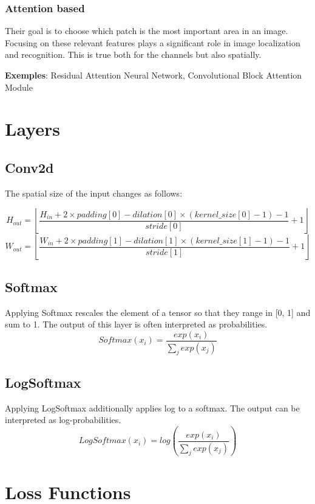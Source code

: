 \subsubsection{Attention based}
Their goal is to choose which patch is the most important area in an image. Focusing on these relevant features plays a significant role in image localization and recognition. This is true both for the channels but also spatially.

\textbf{Exemples}: Residual Attention Neural Network, Convolutional Block Attention Module

\section{Layers}
\subsection{Conv2d}
The spatial size of the input changes as follows:

\begin{equation}
    H_{out} = \left\lfloor \frac{H_{in}+2\times padding[0] - dilation[0]\times (kernel\_size[0]-1)-1}{stride[0]}+1 \right\rfloor
\end{equation}
\begin{equation}
    W_{out} = \left\lfloor \frac{W_{in}+2\times padding[1]-dilation[1]\times(kernel\_size[1]-1)-1}{stride[1]}+1 \right\rfloor
\end{equation}

\subsection{Softmax}
Applying Softmax rescales the element of a tensor so that they range in [0, 1] and sum to 1. The output of this layer is often interpreted as probabilities.
\begin{equation}
    Softmax(x_i) = \frac{exp(x_i)}{\sum_j exp(x_j)}
\end{equation}

\subsection{LogSoftmax}
Applying LogSoftmax additionally applies log to a softmax. The output can be interpreted as log-probabilities.
\begin{equation}
    LogSoftmax(x_i) = log\left(\frac{exp(x_i)}{\sum_j exp(x_j)}\right)
\end{equation}
\section{Loss Functions}

